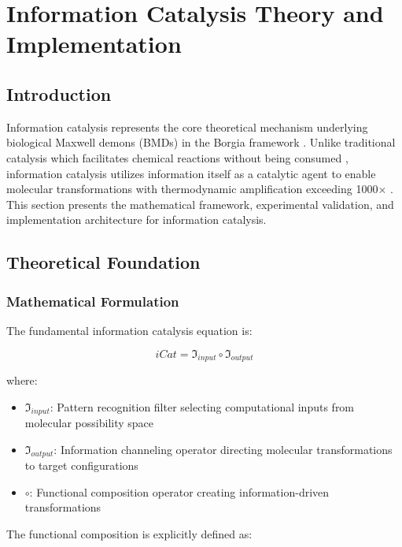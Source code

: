 \section{Information Catalysis Theory and Implementation}

\subsection{Introduction}

Information catalysis represents the core theoretical mechanism underlying biological Maxwell demons (BMDs) in the Borgia framework \cite{mizraji2007biological,sachikonye2024oscillatory}. Unlike traditional catalysis which facilitates chemical reactions without being consumed \cite{atkins2010physical}, information catalysis utilizes information itself as a catalytic agent to enable molecular transformations with thermodynamic amplification exceeding 1000× \cite{landauer1961irreversibility}. This section presents the mathematical framework, experimental validation, and implementation architecture for information catalysis.

\subsection{Theoretical Foundation}

\subsubsection{Mathematical Formulation}

The fundamental information catalysis equation is:

\begin{equation}
iCat = \mathfrak{I}_{input} \circ \mathfrak{I}_{output}
\end{equation}

where:
\begin{itemize}
\item $\mathfrak{I}_{input}$: Pattern recognition filter selecting computational inputs from molecular possibility space
\item $\mathfrak{I}_{output}$: Information channeling operator directing molecular transformations to target configurations  
\item $\circ$: Functional composition operator creating information-driven transformations
\end{itemize}

The functional composition is explicitly defined as:

